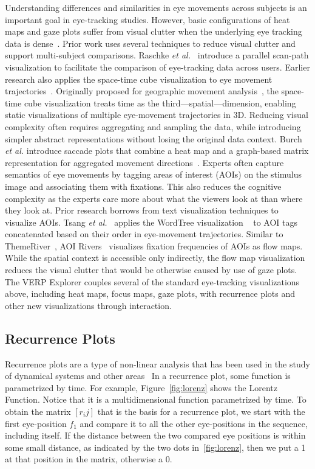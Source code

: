 \documentclass{sigchi}
\newcommand{\etal}{\textit{et al.}\xspace}
\begin{document}
Understanding differences and similarities in eye movements across subjects
is an important goal in eye-tracking studies. However, basic configurations
of heat maps and gaze plots suffer from visual clutter when the underlying
eye tracking data is dense~\cite{Blascheck_2014}. Prior work uses several
techniques to reduce visual clutter and support multi-subject comparisons.
Raschke \etal ~\cite{Raschke_2012} introduce a parallel scan-path
visualization to facilitate the comparison of eye-tracking data across
users.  Earlier research also applies the space-time cube visualization to
eye movement trajectories~\cite{Li_2010,Kurzhals_2013}. Originally proposed
for geographic movement analysis~\cite{Hagerstrand_1970,Kraak_2003}, the
space-time cube visualization treats time as the third—spatial—dimension,
enabling static visualizations of multiple eye-movement trajectories in 3D.
Reducing visual complexity often requires aggregating and sampling the
data, while introducing simpler abstract representations without losing the
original data context.  Burch \etal introduce saccade plots that combine
a heat map  and a graph-based matrix representation for aggregated movement
directions~\cite{Burch_2014b}. Experts often capture semantics of eye
movements by tagging areas of interest (AOIs) on the stimulus image and
associating them with fixations.  This also reduces the cognitive
complexity as the experts care more about what the viewers look at than
where they look at. Prior research borrows from text visualization
techniques to visualize AOIs. Tsang \etal~\cite{Tsang_2010} applies the
WordTree visualization ~\cite{Wattenberg_2008} to AOI tags concatenated
based on their order in eye-movement trajectories. Similar to
ThemeRiver~\cite{Havre_2000}, AOI Rivers~\cite{Burch_2013} visualizes
fixation frequencies of AOIs as flow maps. While the spatial context is
accessible only indirectly, the flow map visualization reduces the visual
clutter that would be otherwise caused by use of gaze plots. The VERP
Explorer couples several of the standard eye-tracking visualizations above,
including heat maps, focus maps, gaze plots, with recurrence plots and
other new visualizations through interaction. 
	

\subsection{Recurrence Plots} 
Recurrence  plots are a type of non-linear
analysis that has been used in the study of dynamical systems and other
areas~\cite{Eckmann_1987,Marwan_2008} In a recurrence plot, some
function is parametrized by time.  For example, Figure~\ref{fig:lorenz} 
shows the Lorentz Function. Notice that it is a multidimensional function
parametrized by time. To obtain the matrix $[r_ij]$ that is the basis for
a recurrence plot, we start with the first eye-position $f_1$  and compare
it to all the other eye-positions in the sequence, including itself. If the
distance  between the two compared eye positions is within some small
distance, as indicated by the two dots in~\ref{fig:lorenz}, then we 
put a 1 at that position in the matrix, otherwise a 0. 
\end{document}
